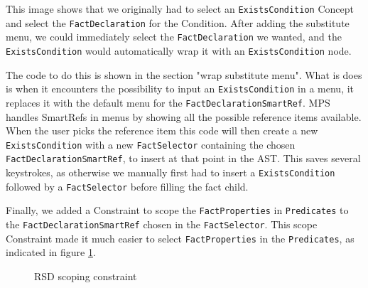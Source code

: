 This image shows that we originally had to select an \texttt{ExistsCondition} Concept and select the \texttt{FactDeclaration} for the Condition.
After adding the substitute menu, we could immediately select the \texttt{FactDeclaration} we wanted, and the \texttt{ExistsCondition} would automatically wrap it with an \texttt{ExistsCondition} node.

The code to do this is shown in the section "wrap substitute menu".
What is does is when it encounters the possibility to input an \texttt{ExistsCondition} in a menu, it replaces it with the default menu for the \texttt{FactDeclarationSmartRef}.
MPS handles SmartRefs in menus by showing all the possible reference items available.
When the user picks the reference item this code will then create a new \texttt{ExistsCondition} with a new \texttt{FactSelector} containing the chosen \texttt{FactDeclarationSmartRef}, to insert at that point in the AST.
This saves several keystrokes, as otherwise we manually first had to insert a \texttt{ExistsCondition} followed by a \texttt{FactSelector} before filling the fact child.

Finally, we added a Constraint to scope the \texttt{FactProperties} in \texttt{Predicates} to the \texttt{FactDeclarationSmartRef} chosen in the \texttt{FactSelector}.
This scope Constraint made it much easier to select \texttt{FactProperties} in the \texttt{Predicates}, as indicated in figure \ref{fig:RSDConstraint}.

\begin{figure}
    \centering
    \caption{RSD scoping constraint}
    \label{fig:RSDConstraint}
\end{figure}

